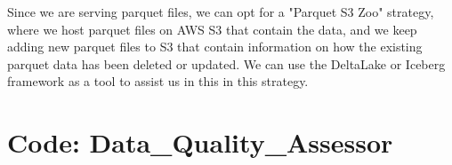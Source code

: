 \documentclass[sigconf]{acmart}
\begin{document}
Since we are serving parquet files, we can opt for a "Parquet S3 Zoo" strategy, where we host parquet files on AWS S3 that contain the data, and we keep adding new parquet files to S3 that contain information on how the existing parquet data has been deleted or updated.
We can use the DeltaLake or Iceberg framework as a tool to assist us in this in this strategy.




\onecolumn
\appendix

\section{Code: Data\_Quality\_Assessor}
\label{sec:dataqualityassessor}



\end{document}
